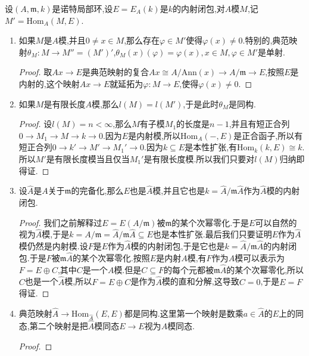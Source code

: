 设$(A,\mathfrak{m},k)$是诺特局部环,设$E=E_A(k)$是$k$的内射闭包,对$A$模$M$,记$M'=\mathrm{Hom}_A(M,E)$.
\begin{enumerate}
	\item 如果$M$是$A$模,并且$0\not=x\in M$,那么存在$\varphi\in M'$使得$\varphi(x)\not=0$.特别的,典范映射$\theta_M:M\to M''=(M')'$,$\theta_M(x)(\varphi)=\varphi(x),x\in M,\varphi\in M'$是单射.
	\begin{proof}
		
		取$Ax\to E$是典范映射的复合$Ax\cong A/\mathrm{Ann}(x)\to A/\mathfrak{m}\to E$,按照$E$是内射的,这个映射$Ax\to E$就延拓为$\varphi:M\to E$,使得$\varphi(x)\not=0$.
	\end{proof}
    \item 如果$M$是有限长度$A$模,那么$l(M)=l(M')$,于是此时$\theta_M$是同构.
    \begin{proof}
    	
    	设$l(M)=n<\infty$,那么$M$有子模$M_1$的长度是$n-1$,并且有短正合列$0\to M_1\to M\to k\to0$.因为$E$是内射模,所以$\mathrm{Hom}_A(-,E)$是正合函子,所以有短正合列$0\to k'\to M'\to M_1'\to0$.因为$k\subseteq E$是本性扩张,有$\mathrm{Hom}_k(k,E)\cong k$.所以$M'$是有限长度模当且仅当$M_1'$是有限长度模.所以我们只要对$l(M)$归纳即得证.
    \end{proof}
    \item 设$\widehat{A}$是$A$关于$\mathfrak{m}$的完备化,那么$E$也是$\widehat{A}$模,并且它也是$k=\widehat{A}/\mathfrak{m}\widehat{A}$作为$\widehat{A}$模的内射闭包.
    \begin{proof}
    	
    	我们之前解释过$E=E(A/\mathfrak{m})$被$\mathfrak{m}$的某个次幂零化.于是$E$可以自然的视为$\widehat{A}$模,于是$k=A/\mathfrak{m}=\widehat{A}/\mathfrak{m}\widehat{A}\subseteq E$也是本性扩张.最后我们只要证明$E$作为$\widehat{A}$模仍然是内射模.设$F$是$E$作为$\widehat{A}$模的内射闭包,于是它也是$k=\widehat{A}/\mathfrak{m}\widehat{A}$的内射闭包.于是$F$被$\mathfrak{m}\widehat{A}$的某个次幂零化.按照$E$是内射$A$模,有$F$作为$A$模可以表示为$F=E\oplus C$,其中$C$是一个$A$模.但是$C\subseteq F$的每个元都被$\mathfrak{m}\widehat{A}$的某个次幂零化,所以$C$也是一个$\widehat{A}$模,所以$F=E\oplus C$是作为$\widehat{A}$模的直和分解,这导致$C=0$,于是$E=F$得证.
    \end{proof}
    \item 典范映射$\widehat{A}\to\mathrm{Hom}_{\widehat{A}}(E,E)$都是同构.这里第一个映射是数乘$a\in\widehat{A}$的$E$上的同态,第二个映射是把$\widehat{A}$模同态$E\to E$视为$A$模同态.
    \begin{proof}
    	

\end{proof}
\end{enumerate}
